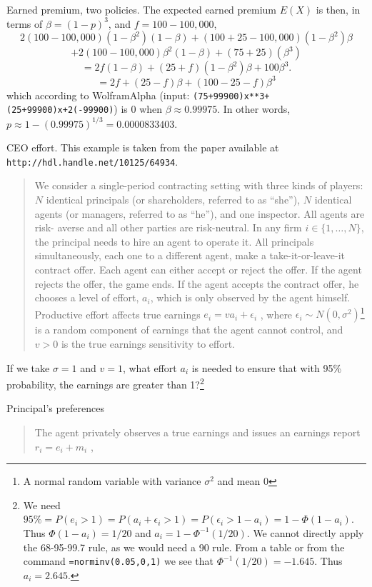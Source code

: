 \begin{example}{Earned premium, two policies.}
		The expected earned premium $E(X)$ is then, in terms of $\beta=(1-p)^3$, and $f=100-100,000$,
		\[
		2(100-100,000) (1-\beta^2)(1-\beta) +
		(100+25-100,000) (1-\beta^2)\beta
		\]
		\[ +
		2(100-100,000) \beta^2(1-\beta) +
		(75+25)(\beta^3)
		\]
		\[
			= 2f(1-\beta) + (25+f)(1-\beta^2)\beta + 100\beta^3.
		\]
		\[
			= 2f + (25-f)\beta + (100-25-f)\beta^3
		\]
		which according to WolframAlpha (input:
			\verb!(75+99900)x**3+(25+99900)x+2(-99900)!)
		is 0 when $\beta\approx 0.99975$. In other words,
		$p\approx 1-(0.99975)^{1/3}=0.0000833403$.
	\begin{example}{CEO effort.}
		This example is taken from the paper  available at \verb!http://hdl.handle.net/10125/64934!.
		\begin{quote}
		We consider a single-period contracting setting with three kinds of players:
		$N$ identical principals (or shareholders, referred to as ``she''),
		$N$ identical agents (or managers, referred to as ``he''), and one inspector.
		All agents are risk- averse and all other parties are risk-neutral.
		In any firm $i \in \{1,\dots,N\}$, the principal needs to hire an agent to operate it.
		All principals simultaneously, each one to a different agent, make a take-it-or-leave-it contract offer.
		Each agent can either accept or reject the offer. If the agent rejects the offer, the game ends.
		If the agent accepts the contract offer, he chooses a level of effort, $a_i$, which is only observed by the agent himself.
		Productive effort affects true earnings $e_i = va_i + \epsilon_i$ , where $\epsilon_i\sim N(0,\sigma^2)$\footnote{A normal random variable with variance $\sigma^2$ and mean 0} is a random component of earnings that the agent cannot control, and $v > 0$ is the true earnings sensitivity to effort.
		\end{quote}
		If we take $\sigma=1$ and $v=1$, what effort $a_i$ is needed to ensure that with 95\% probability, the earnings are greater than 1?\footnote{We need $95\%=P(e_i>1)=P(a_i+\epsilon_i>1)=P(\epsilon_i>1-a_i)=1-\Phi(1-a_i)$. Thus $\Phi(1-a_i)=1/20$ and $a_i=1-\Phi^{-1}(1/20)$.
		We cannot directly apply the 68-95-99.7 rule, as we would need a 90 rule.
		From a table or from the command \texttt{=norminv(0.05,0,1)} we see that $\Phi^{-1}(1/20)=-1.645$.
		Thus $a_i=2.645$.
		}
	\end{example}
	\begin{example}{Principal's preferences}
		\begin{quote}
			The agent privately observes a true earnings and issues an earnings report $r_i = e_i + m_i$ ,

\end{quote}
\end{example}
\end{example}
